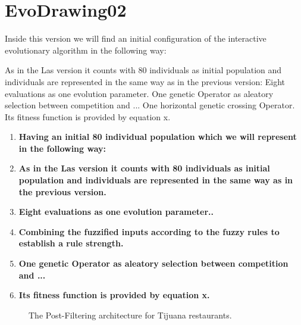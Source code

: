 \section{EvoDrawing02}

Inside this version we will find an initial configuration of the interactive evolutionary algorithm in the following way:

As in the Las version it counts with 80 individuals as initial population and individuals are represented in the same way as in the previous version:
Eight evaluations as one evolution parameter.
One genetic Operator as aleatory selection between competition and ...      
One horizontal genetic crossing Operator.
Its fitness function is provided by equation x.

\begin{enumerate}
	\item  \textbf{Having an initial 80 individual population which we will represent in the following way:}
	
	
	
	\item  \textbf{As in the Las version it counts with 80 individuals as initial population and individuals are represented in the same way as in the previous version.}
	
	\item  \textbf{Eight evaluations as one evolution parameter..} 
	\item  \textbf{Combining the fuzzified inputs according to the fuzzy rules to establish a rule strength.} 
	\item  \textbf{One genetic Operator as aleatory selection between competition and ...}
	\item  \textbf{Its fitness function is provided by equation x.}
\end{enumerate}

\begin{figure}
	\centering
	\setlength\fboxsep{0pt}
	\caption{The Post-Filtering architecture for Tijuana restaurants.}
	\label{fig:postfiltering4}     
\end{figure}



